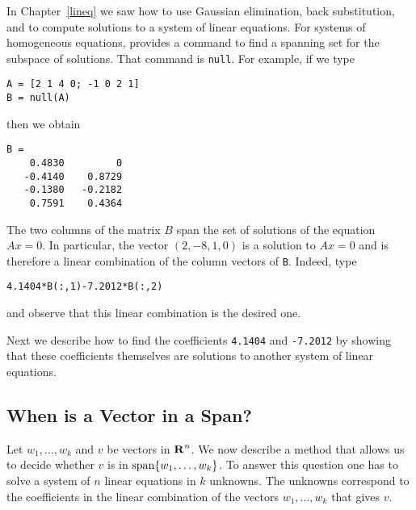 \documentclass{ximera}
\begin{document}
In Chapter~\ref{lineq} we saw how to use Gaussian elimination,
back substitution, and \Matlab to compute solutions to a system
of linear equations.  For systems of
homogeneous equations, \Matlab
provides a command to find a spanning set for the subspace of solutions.
That command is {\tt null}.  For example, if we type
\begin{verbatim}
A = [2 1 4 0; -1 0 2 1]
B = null(A)
\end{verbatim} 
then we obtain
\begin{verbatim}
B =
    0.4830         0
   -0.4140    0.8729
   -0.1380   -0.2182
    0.7591    0.4364
\end{verbatim}
The two columns of the matrix $B$ span the set of solutions of
the equation $Ax=0$.  In particular, the vector $(2,-8,1,0)$ is a
solution to $Ax=0$ and is therefore a
linear combination  of the
column vectors of {\tt B}.  Indeed, type
\begin{verbatim}
4.1404*B(:,1)-7.2012*B(:,2)
\end{verbatim}
and observe that this linear combination is the desired one.

Next we describe how to find the coefficients {\tt 4.1404} and
{\tt -7.2012} by showing that these coefficients themselves are
solutions to another system of linear equations.

\subsection*{When is a Vector in a Span?} 

Let $w_1,\ldots,w_k$ and $v$ be vectors in $\mbox{$\bf{R}$}^n$.  We now
describe a method that allows us to decide whether $v$ is in
${\rm span}\{w_1,\ldots,w_k\}$.  To answer this question one has
to solve a system of $n$ linear equations in $k$ unknowns.
The unknowns correspond to the coefficients in the linear
combination of the vectors $w_1,\ldots,w_k$ that gives $v$.
\end{document}
